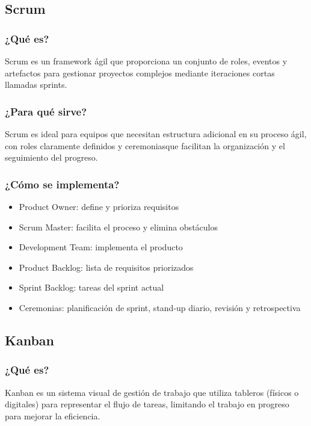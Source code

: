 \documentclass[12pt, a4paper]{article}
\begin{document}
\subsection{Scrum}

\subsubsection{¿Qué es?}
Scrum es un framework ágil que proporciona un conjunto de roles, eventos y artefactos para gestionar proyectos complejos mediante iteraciones cortas llamadas sprints.

\subsubsection{¿Para qué sirve?}
Scrum es ideal para equipos que necesitan estructura adicional en su proceso ágil, con roles claramente definidos y ceremoniasque facilitan la organización y el seguimiento del progreso.

\subsubsection{¿Cómo se implementa?}
\begin{itemize}
    \item Product Owner: define y prioriza requisitos
    \item Scrum Master: facilita el proceso y elimina obstáculos
    \item Development Team: implementa el producto
    \item Product Backlog: lista de requisitos priorizados
    \item Sprint Backlog: tareas del sprint actual
    \item Ceremonias: planificación de sprint, stand-up diario, revisión y retrospectiva
\end{itemize}

\subsection{Kanban}

\subsubsection{¿Qué es?}
Kanban es un sistema visual de gestión de trabajo que utiliza tableros (físicos o digitales) para representar el flujo de tareas, limitando el trabajo en progreso para mejorar la eficiencia.
\end{document}
